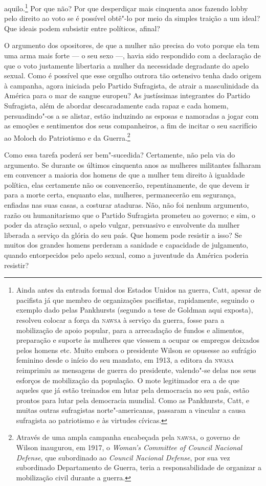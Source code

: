 aquilo.\footnote{Ainda antes da entrada formal dos Estados Unidos na
  guerra, Catt, apesar de pacifista já que membro de organizações pacifistas,
  rapidamente, seguindo o exemplo dado pelas Pankhursts (segundo a tese
  de Goldman aqui exposta), resolveu colocar a força da \textsc{nawsa} à
  serviço da guerra, fosse para a mobilização de apoio popular, para a
  arrecadação de fundos e alimentos, preparação e suporte às mulheres
  que viessem a ocupar os empregos deixados pelos homens etc. Muito
  embora o presidente Wilson se opusesse ao sufrágio feminino desde o
  início do seu mandato, em 1913, a editora da \textsc{nwasa} reimprimiu as
  mensagens de guerra do presidente, valendo"-se delas nos seus esforços
  de mobilização da população. O mote legitimador era a de que aqueles
  que já estão treinados em lutar pela democracia no seu país, estão
  prontos para lutar pela democracia mundial. Como as Pankhursts, Catt,
  e muitas outras sufragistas norte"-americanas, passaram a vincular a
  causa sufragista ao patriotismo e às virtudes cívicas.} Por que não?
Por que desperdiçar mais cinquenta anos fazendo lobby pelo direito ao
voto se é possível obtê"-lo por meio da simples traição a um ideal? Que
ideais podem subsistir entre políticos, afinal?

O argumento dos opositores, de que a mulher não precisa do voto porque
ela tem uma arma mais forte --- o seu sexo ---, havia sido respondido com
a declaração de que o voto justamente libertaria a mulher da necessidade
degradante do apelo sexual. Como é possível que esse orgulho outrora tão ostensivo
tenha dado origem à campanha, agora iniciada pelo Partido Sufragista, de
atrair a masculinidade da América para o mar de sangue europeu? As
justíssimas integrantes do Partido Sufragista, além de abordar
descaradamente cada rapaz e cada homem, persuadindo"-os a se alistar,
estão induzindo as esposas e namoradas a jogar com as emoções e
sentimentos dos seus companheiros, a fim de incitar o seu sacrifício ao
Moloch do Patriotismo e da Guerra.\footnote{Através de uma ampla
  campanha encabeçada pela \textsc{nawsa}, o governo de Wilson inaugurou, em
  1917, o \emph{Woman's Committee of Council Nacional Defense}, que
  subordinado ao \emph{Council Nacional Defense}, por sua vez
  subordinado Departamento de Guerra, teria a responsabilidade de
  organizar a mobilização civil durante a guerra.}

Como essa tarefa poderá ser bem"-sucedida? Certamente, não pela via do
argumento. Se durante os últimos cinquenta anos as mulheres militantes
falharam em convencer a maioria dos homens de que a mulher tem direito
à igualdade política, elas certamente não os convencerão,
repentinamente, de que devem ir para a morte certa, enquanto elas,
mulheres, permanecerão em segurança, enfiadas nas suas casas, a costurar
ataduras. Não, não foi nenhum argumento, razão ou humanitarismo que o
Partido Sufragista prometeu ao governo; e sim, o poder da atração
sexual, o apelo vulgar, persuasivo e envolvente da mulher liberada a
serviço da glória do seu país. Que homem pode resistir a isso? Se muitos
dos grandes homens perderam a sanidade e capacidade de julgamento,
quando entorpecidos pelo apelo sexual, como a juventude da América
poderia resistir?

